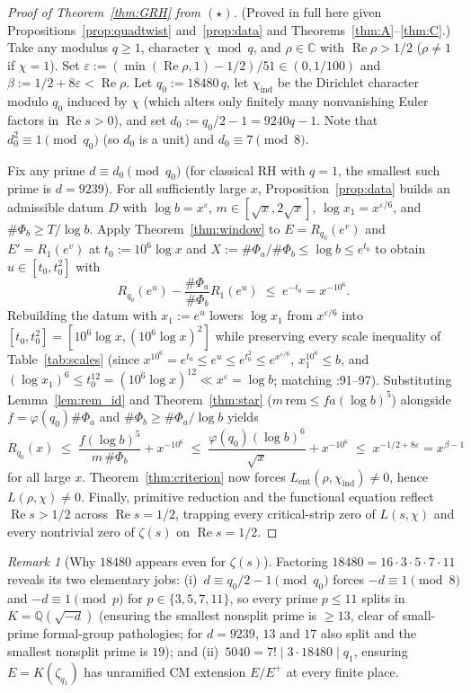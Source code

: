 \documentclass[11pt]{amsart}
\newcommand{\code}[1]{\ifmmode\text{\normalfont\ttfamily\nolinkurl{#1}}\else{\upshape\mdseries\ttfamily\nolinkurl{#1}}\fi}
\newcommand{\CC}{\mathbb{C}}
\newcommand{\QQ}{\mathbb{Q}}
\newcommand{\eps}{\varepsilon}
\newcommand{\re}{\operatorname{Re}}
\newcommand{\rem}{\mathrm{rem}}
\theoremstyle{definition}
\theoremstyle{remark}
\newtheorem{remark}[theorem]{Remark}
\begin{document}
\begin{proof}[Proof of Theorem~\ref{thm:GRH} from $(\star)$]
(Proved in full here given Propositions~\ref{prop:quadtwist} and~\ref{prop:data} and Theorems~\ref{thm:A}--\ref{thm:C}.) Take any modulus $q\ge 1$, character $\chi\bmod q$, and $\rho\in\CC$ with $\re\rho>1/2$ ($\rho\ne 1$ if $\chi=1$). Set $\eps:=(\min(\re\rho,1)-1/2)/51\in(0,1/100)$ and $\beta:=1/2+8\eps<\re\rho$. Let $q_0:=18480\,q$, let $\chi_{\mathrm{ind}}$ be the Dirichlet character modulo $q_0$ induced by $\chi$ (which alters only finitely many nonvanishing Euler factors in $\re s>0$), and set $d_0:=q_0/2-1=9240q-1$. Note that $d_0^2\equiv 1\pmod{q_0}$ (so $d_0$ is a unit) and $d_0\equiv 7\pmod 8$.

Fix any prime $d\equiv d_0\pmod{q_0}$ (for classical RH with $q=1$, the smallest such prime is $d=9239$). For all sufficiently large $x$, Proposition~\ref{prop:data} builds an admissible datum $D$ with $\log b=x^\eps$, $m\in[\sqrt{x},2\sqrt{x}]$, $\log x_1=x^{\eps/6}$, and $\#\Phi_b\ge T/\log b$. Apply Theorem~\ref{thm:window} to $E=R_{q_0}(e^v)$ and $E'=R_1(e^v)$ at $t_0:=10^6\log x$ and $X:=\#\Phi_a/\#\Phi_b\le\log b\le e^{t_0}$ to obtain $u\in[t_0,t_0^2]$ with
\[
 R_{q_0}(e^u)-\frac{\#\Phi_a}{\#\Phi_b}R_1(e^u) \;\le\; e^{-t_0}=x^{-10^6}.
\]
Rebuilding the datum with $x_1:=e^u$ lowers $\log x_1$ from $x^{\eps/6}$ into $[t_0,t_0^2]=[10^6\log x,(10^6\log x)^2]$ while preserving every scale inequality of Table~\ref{tab:scales} (since $x^{10^6}=e^{t_0}\le e^u\le e^{t_0^2}\le e^{x^{\eps/6}}$, $x_1^{10^6}\le b$, and $(\log x_1)^6\le t_0^{12}=(10^6\log x)^{12}\ll x^\eps=\log b$; matching \code{Step4_MainProof.lean}:91--97). Substituting Lemma~\ref{lem:rem_id} and Theorem~\ref{thm:star} ($m\,\rem\le fa(\log b)^5$) alongside $f=\varphi(q_0)\#\Phi_a$ and $\#\Phi_b\ge\#\Phi_a/\log b$ yields
\[
 R_{q_0}(x) \;\le\; \frac{f(\log b)^5}{m\,\#\Phi_b}+x^{-10^6}
 \;\le\; \frac{\varphi(q_0)(\log b)^6}{\sqrt{x}}+x^{-10^6}
 \;\le\; x^{-1/2+8\eps}=x^{\beta-1}
\]
for all large $x$. Theorem~\ref{thm:criterion} now forces $L_{\mathrm{ent}}(\rho,\chi_{\mathrm{ind}})\ne 0$, hence $L(\rho,\chi)\ne 0$. Finally, primitive reduction and the functional equation reflect $\re s>1/2$ across $\re s=1/2$, trapping every critical-strip zero of $L(s,\chi)$ and every nontrivial zero of $\zeta(s)$ on $\re s=1/2$.
\end{proof}

\begin{remark}[Why $18480$ appears even for $\zeta(s)$]
Factoring $18480=16\cdot 3\cdot 5\cdot 7\cdot 11$ reveals its two elementary jobs: (i)~$d\equiv q_0/2-1\pmod{q_0}$ forces $-d\equiv 1\pmod 8$ and $-d\equiv 1\pmod p$ for $p\in\{3,5,7,11\}$, so every prime $p\le 11$ splits in $K=\QQ(\sqrt{-d})$ (ensuring the smallest nonsplit prime is $\ge 13$, clear of small-prime formal-group pathologies; for $d=9239$, $13$ and $17$ also split and the smallest nonsplit prime is $19$); and (ii)~$5040=7!\mid 3\cdot 18480\mid q_1$, ensuring $E=K(\zeta_{q_1})$ has unramified CM extension $E/E^+$ at every finite place.
\end{remark}
\end{document}
